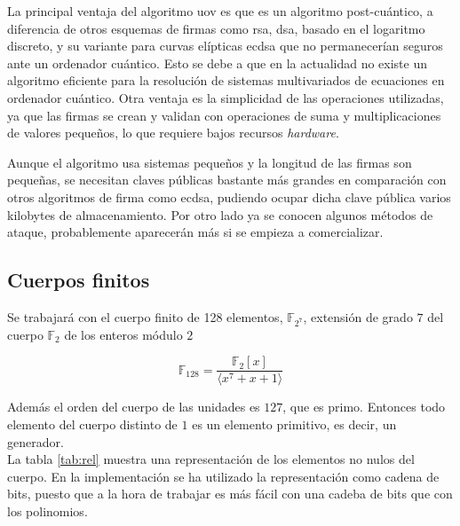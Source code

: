 La principal ventaja del algoritmo \acrshort{uov} es que es un algoritmo post-cuántico, a diferencia de otros esquemas de firmas como \acrshort{rsa}, \acrshort{dsa}, basado en el logaritmo discreto, y su variante para curvas elípticas \mbox{\acrshort{ecdsa}} que no permanecerían seguros ante un ordenador cuántico. Esto se debe a que en la actualidad no existe un algoritmo eficiente para la resolución de sistemas multivariados de ecuaciones  en ordenador cuántico. Otra ventaja es la simplicidad de las operaciones utilizadas, ya que las firmas se crean y validan con operaciones de suma y multiplicaciones de valores pequeños, lo que requiere bajos recursos \textit{hardware}. 

Aunque el algoritmo usa sistemas pequeños y la longitud de las firmas son pequeñas, se necesitan claves públicas bastante más grandes en comparación con otros algoritmos de firma como \mbox{\acrshort{ecdsa}}, pudiendo ocupar dicha clave pública varios kilobytes de almacenamiento. Por otro lado ya se conocen algunos métodos de ataque, probablemente aparecerán más si se empieza a comercializar.\\

\subsection{Cuerpos finitos}
Se trabajará con el cuerpo finito de 128 elementos, $\mathds{F}_{2^7}$, extensión de grado $7$ del cuerpo $\mathds{F}_2$ de los enteros módulo $2$
 
\begin{equation}
\mathds{F}_{128} = \frac{\mathds{F}_2[x]}{\langle x^7 + x + 1 \rangle}
\end{equation}

Además el orden del cuerpo de las unidades es $127$, que es primo. Entonces todo elemento del cuerpo distinto de $1$ es un elemento primitivo, es decir, un generador.\\

La tabla \ref{tab:rel} muestra una representación de los elementos no nulos del cuerpo. En la implementación se ha utilizado la representación como cadena de bits, puesto que a la hora de trabajar es más fácil con una cadeba de bits que con los polinomios.

